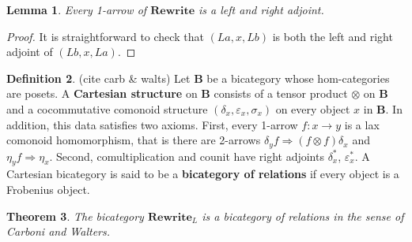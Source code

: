 \documentclass{amsart}
\renewcommand{\epsilon}{\varepsilon}
\newcommand{\defn}[1]{\textbf{#1}}
\newcommand{\cat}[1]{\mathbf{#1}}
\newcommand{\from}{\colon}
\newcommand{\Rewrite}{\mathbf{Rewrite} }
\newcommand{\edit}[1]{\textcolor{editcolour}{(#1)}}
\newtheorem{theorem}{Theorem}[section]
\newtheorem{lemma}[theorem]{Lemma}
\theoremstyle{remark}
\theoremstyle{definition}
\newtheorem{definition}[theorem]{Definition}
\begin{document}
\begin{lemma} \label{thm:bicat-rewr-arrows-dual}
  Every 1-arrow of $ \Rewrite $ is a left and right adjoint.
\end{lemma}

\begin{proof}
  It is straightforward to check that $ ( La , x , Lb ) $ is both the
  left and right adjoint of $ ( Lb , x , La ) $.
\end{proof}

\begin{definition} \label{def:bicat-rels}
\edit{cite carb \& walts}
  Let $ \cat{B} $ be a bicategory whose hom-categories are posets. A
  \defn{Cartesian structure} on $ \cat{B} $ consists of a tensor
  product $ \otimes $ on $ \cat{B} $ and a cocommutative comonoid
  structure $ (\delta_x , \epsilon_x , \sigma_x ) $ on every object
  $ x $ in $ \cat{B} $.  In addition, this data satisfies two
  axioms. First, every 1-arrow $ f \from x \to y $ is a lax comonoid
  homomorphism, that is there are 2-arrows
  $ \delta_y f \Rightarrow (f \otimes f) \delta_x $ and
  $ \eta_y f \Rightarrow \eta_x $. Second, comultiplication and counit
  have right adjoints $ \delta^\ast_x $, $ \epsilon^\ast_x $. A
  Cartesian bicategory is said to be a \defn{bicategory of relations}
  if every object is a Frobenius object.
\end{definition}

\begin{theorem} \label{thm:bicat-rewr-bicat-rel}
   The bicategory $ \Rewrite_{L} $ is a bicategory of relations in the
   sense of Carboni and Walters.
\end{theorem}
\end{document}
